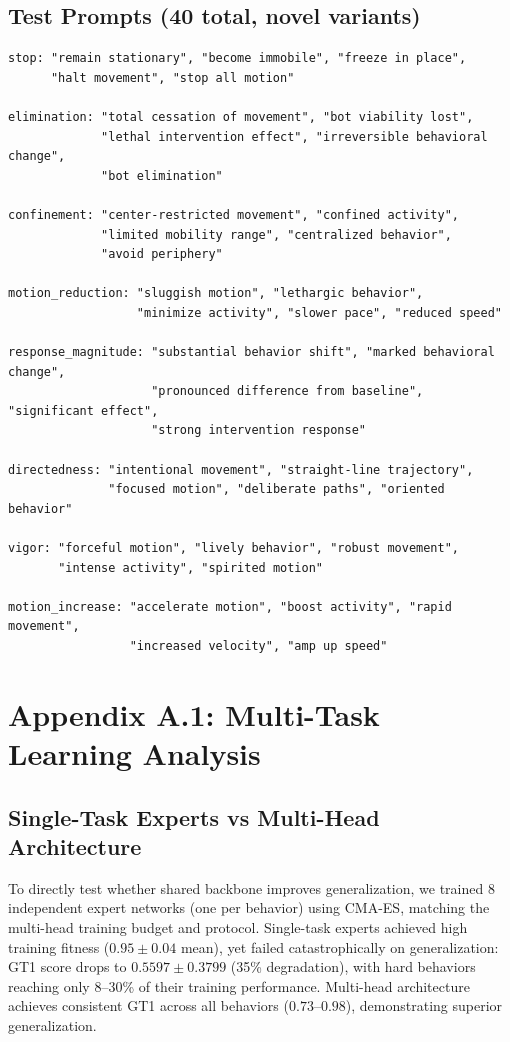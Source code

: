 \documentclass{article}
\begin{document}
\subsection{Test Prompts (40 total, novel variants)}
\begin{verbatim}
stop: "remain stationary", "become immobile", "freeze in place",
      "halt movement", "stop all motion"

elimination: "total cessation of movement", "bot viability lost",
             "lethal intervention effect", "irreversible behavioral change",
             "bot elimination"

confinement: "center-restricted movement", "confined activity",
             "limited mobility range", "centralized behavior",
             "avoid periphery"

motion_reduction: "sluggish motion", "lethargic behavior",
                  "minimize activity", "slower pace", "reduced speed"

response_magnitude: "substantial behavior shift", "marked behavioral change",
                    "pronounced difference from baseline", "significant effect",
                    "strong intervention response"

directedness: "intentional movement", "straight-line trajectory",
              "focused motion", "deliberate paths", "oriented behavior"

vigor: "forceful motion", "lively behavior", "robust movement",
       "intense activity", "spirited motion"

motion_increase: "accelerate motion", "boost activity", "rapid movement",
                 "increased velocity", "amp up speed"
\end{verbatim}

\section*{Appendix A.1: Multi-Task Learning Analysis}
\label{app:multitask}

\subsection{Single-Task Experts vs Multi-Head Architecture}

To directly test whether shared backbone improves generalization, we trained 8 independent expert networks (one per behavior) using CMA-ES, matching the multi-head training budget and protocol. Single-task experts achieved high training fitness ($0.95 \pm 0.04$ mean), yet failed catastrophically on generalization: GT1 score drops to $0.5597 \pm 0.3799$ (35\% degradation), with hard behaviors reaching only 8--30\% of their training performance. Multi-head architecture achieves consistent GT1 across all behaviors ($0.73$--$0.98$), demonstrating superior generalization.
\end{document}
